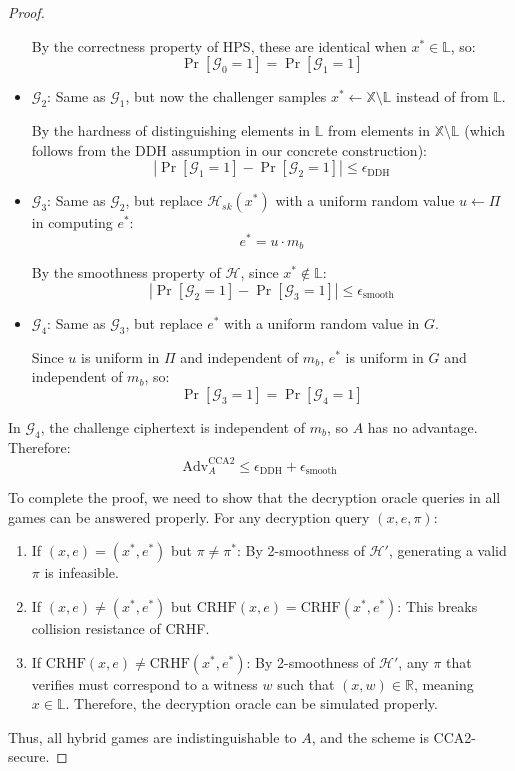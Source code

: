 \begin{proof}
\begin{itemize}
    By the correctness property of HPS, these are identical when $x^* \in \mathbb{L}$, so:
    \[ \Pr[\mathcal{G}_0 = 1] = \Pr[\mathcal{G}_1 = 1] \]

    \item $\mathcal{G}_2$: Same as $\mathcal{G}_1$, but now the challenger samples $x^* \gets \mathbb{X} \setminus \mathbb{L}$ instead of from $\mathbb{L}$.
    
    By the hardness of distinguishing elements in $\mathbb{L}$ from elements in $\mathbb{X} \setminus \mathbb{L}$ (which follows from the DDH assumption in our concrete construction):
    \[ |\Pr[\mathcal{G}_1 = 1] - \Pr[\mathcal{G}_2 = 1]| \leq \epsilon_{\text{DDH}} \]

    \item $\mathcal{G}_3$: Same as $\mathcal{G}_2$, but replace $\mathcal{H}_{sk}(x^*)$ with a uniform random value $u \gets \Pi$ in computing $e^*$:
    \[ e^* = u \cdot m_b \]
    
    By the smoothness property of $\mathcal{H}$, since $x^* \notin \mathbb{L}$:
    \[ |\Pr[\mathcal{G}_2 = 1] - \Pr[\mathcal{G}_3 = 1]| \leq \epsilon_{\text{smooth}} \]

    \item $\mathcal{G}_4$: Same as $\mathcal{G}_3$, but replace $e^*$ with a uniform random value in $G$. 
    
    Since $u$ is uniform in $\Pi$ and independent of $m_b$, $e^*$ is uniform in $G$ and independent of $m_b$, so:
    \[ \Pr[\mathcal{G}_3 = 1] = \Pr[\mathcal{G}_4 = 1] \]
\end{itemize}

In $\mathcal{G}_4$, the challenge ciphertext is independent of $m_b$, so $A$ has no advantage. Therefore:
\[ \text{Adv}^{\text{CCA2}}_A \leq \epsilon_{\text{DDH}} + \epsilon_{\text{smooth}} \]

To complete the proof, we need to show that the decryption oracle queries in all games can be answered properly. For any decryption query $(x,e,\pi)$:

\begin{enumerate}
    \item If $(x,e) = (x^*,e^*)$ but $\pi \neq \pi^*$: By 2-smoothness of $\mathcal{H}'$, generating a valid $\pi$ is infeasible.
    \item If $(x,e) \neq (x^*,e^*)$ but $\text{CRHF}(x,e) = \text{CRHF}(x^*,e^*)$: This breaks collision resistance of CRHF.
    \item If $\text{CRHF}(x,e) \neq \text{CRHF}(x^*,e^*)$: By 2-smoothness of $\mathcal{H}'$, any $\pi$ that verifies must correspond to a witness $w$ such that $(x,w) \in \mathbb{R}$, meaning $x \in \mathbb{L}$. Therefore, the decryption oracle can be simulated properly.
\end{enumerate}

Thus, all hybrid games are indistinguishable to $A$, and the scheme is CCA2-secure.
\end{proof}
